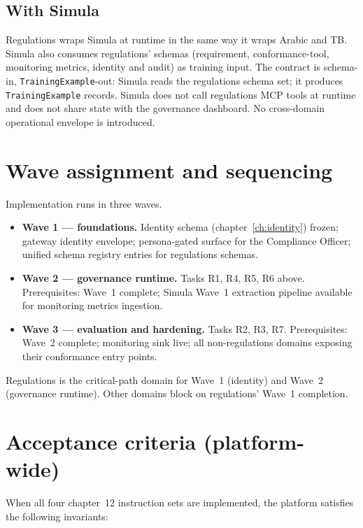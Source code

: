 \documentclass[11pt,a4paper,twoside]{report}
\begin{document}
\subsection{With Simula}
Regulations wraps Simula at runtime in the same way it wraps Arabic
and TB. Simula also consumes regulations' schemas (requirement,
conformance-tool, monitoring metrics, identity and audit) as
training input. The contract is schema-in,
\texttt{TrainingExample}-out: Simula reads the regulations schema
set; it produces \texttt{TrainingExample} records. Simula does not
call regulations MCP tools at runtime and does not share state with
the governance dashboard. No cross-domain operational envelope is
introduced.

\section{Wave assignment and sequencing}
\label{sec:agent-waves}
Implementation runs in three waves.

\begin{itemize}
\item \textbf{Wave 1 --- foundations.} Identity schema
(chapter~\ref{ch:identity}) frozen; gateway identity envelope;
persona-gated surface for the Compliance Officer; unified schema
registry entries for regulations schemas.
\item \textbf{Wave 2 --- governance runtime.} Tasks R1, R4, R5, R6
above. Prerequisites: Wave~1 complete; Simula Wave~1 extraction
pipeline available for monitoring metrics ingestion.
\item \textbf{Wave 3 --- evaluation and hardening.} Tasks R2, R3,
R7. Prerequisites: Wave~2 complete; monitoring sink live; all
non-regulations domains exposing their conformance entry
points.
\end{itemize}

Regulations is the critical-path domain for Wave~1 (identity) and
Wave~2 (governance runtime). Other domains block on regulations'
Wave~1 completion.

\section{Acceptance criteria (platform-wide)}
\label{sec:agent-acceptance}
When all four chapter~12 instruction sets are implemented, the
platform satisfies the following invariants:
\end{document}
